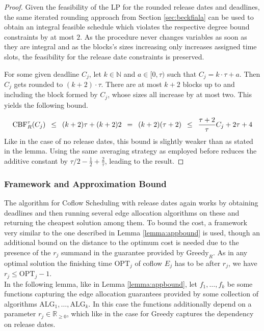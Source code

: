\documentclass[11pt]{article}
\newcommand{\Hquad}{\hspace{0.5em}}
\begin{document}
\begin{proof}
Given the feasibility of the LP for the rounded release dates and deadlines, the same iterated rounding approach from Section \ref{sec:beckfiala} can be used to obtain an integral feasible schedule which violates the respective degree bound constraints by at most $2$. As the procedure never changes variables as soon as they are integral and as the blocks's sizes increasing only increases assigned time slots, the feasibility for the release date constraints is preserved.

For some given deadline $C_j$, let $k \in \mathbb{N}$ and $a \in [0,\tau)$ such that $C_j = k\cdot \tau + a$. Then $C_j$ gets rounded to $(k+2)\cdot \tau$. There are at most $k+2$ blocks up to and including the block formed by $C_j$, whose sizes all increase by at most two. This yields the following bound.

\begin{equation*}
    \mathrm{CBF}^\tau_R(C_j) \Hquad\le\Hquad (k+2)\tau + (k+2)2 \Hquad=\Hquad (k+2)(\tau+2) \Hquad\le\Hquad \frac{\tau+2}{\tau}C_j + 2\tau + 4
\end{equation*}
Like in the case of no release dates, this bound is slightly weaker than as stated in the lemma. Using the same averaging strategy as employed before reduces the additive constant by $\tau/2 - \tfrac{1}{2} + \frac{2}{\tau}$, leading to the result. 
\end{proof}

\subsubsection*{Framework and Approximation Bound}
The algorithm for Coflow Scheduling with release dates again works by obtaining deadlines and then running several edge allocation algorithms on these and returning the cheapest solution among them. To bound the cost, a framework very similar to the one described in Lemma \ref{lemma:appbound} is used, though an additional bound on the distance to the optimum cost is needed due to the presence of the $r_j$ summand in the guarantee provided by $\mathrm{Greedy}_R$. As in any optimal solution the finishing time $\mathrm{OPT}_j$ of coflow $E_j$ has to be after $r_j$, we have $r_j \le \mathrm{OPT}_j - 1$.\\

In the following lemma, like in Lemma \ref{lemma:appbound}, let $f_1,\dotsc,f_k$ be some functions capturing the edge allocation guarantees provided by some collection of algorithms $\mathrm{ALG}_1,\dotsc,\mathrm{ALG}_k$. In this case the functions additionally depend on a parameter $r_j \in \mathbb{R}_{\ge 0}$, which like in the case for $\mathrm{Greedy}$ captures the dependency on release dates.
\end{document}
